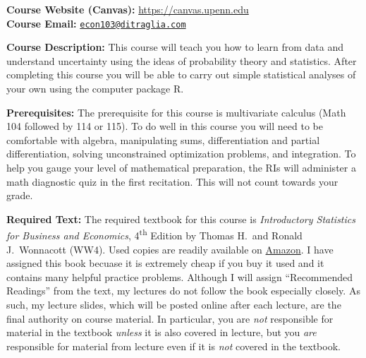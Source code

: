 \documentclass[11pt, letterpaper]{article}
\begin{document}
\medskip

 
\noindent \textbf{Course Website (Canvas):} \url{https://canvas.upenn.edu}\\
\noindent \textbf{Course Email:} \href{mailto:econ103@ditraglia.com}{\texttt{econ103@ditraglia.com}}

\bigskip



\noindent \textbf{Course Description:} 
This course will teach you how to learn from data and understand uncertainty using the ideas of probability theory and statistics. 
After completing this course you will be able to carry out simple statistical analyses of your own using the computer package R.


\medskip

\noindent \textbf{Prerequisites:} 
The prerequisite for this course is multivariate calculus (Math 104 followed by 114 or 115). 
To do well in this course you will need to be comfortable with algebra, manipulating sums, differentiation and partial differentiation, solving unconstrained optimization problems, and integration. 
To help you gauge your level of mathematical preparation, the RIs will administer a math diagnostic quiz in the first recitation. 
This will not count towards your grade.




\medskip

\noindent \textbf{Required Text:} 
The required textbook for this course is \emph{Introductory Statistics for Business and Economics}, 4\textsuperscript{th} Edition by Thomas H.\ and Ronald J.\ Wonnacott (WW4). 
Used copies are readily available on \href{http://tinyurl.com/ECON103-2013A}{Amazon}.
I have assigned this book becuase it is extremely cheap if you buy it used and it contains many helpful practice problems.
Although I will assign ``Recommended Readings'' from the text, my lectures do not follow the book especially closely.
As such, my lecture slides, which will be posted online after each lecture, are the final authority on course material. 
In particular, you are \emph{not} responsible for material in the textbook \emph{unless} it is also covered in lecture, but you \emph{are} responsible for material from lecture even if it is \emph{not} covered in the textbook.

\medskip
\end{document}
